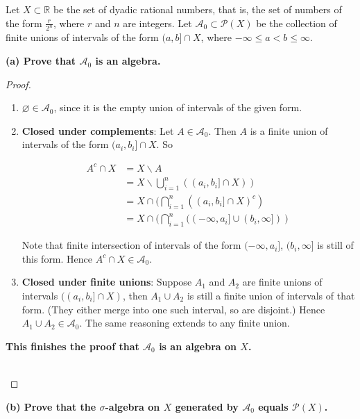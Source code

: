 Let \(X \subset \mathbb{R}\) be the set of dyadic rational numbers, that is, the set of numbers of the form \(\frac{r}{2^{n}}\), where \(r\) and \(n\) are integers. Let \(\mathcal{A}_{0} \subset \mathcal{P}(X)\) be the collection of finite unions of intervals of the form \((a,b\rbrack \cap X\), where \(- \infty \leq a < b \leq \infty\).

\textbf{(a) Prove that \(\mathcal{A}_{0}\) is an algebra.}

\begin{proof}

\begin{enumerate}
\item
  \(\varnothing \in \mathcal{A}_{0}\), since it is the empty union of intervals of the given form.
\item
  \textbf{Closed under complements}: Let \(A \in \mathcal{A}_{0}\). Then \(A\) is a finite union of intervals of the form \((a_{i},b_{i}\rbrack \cap X\). So

  \[\begin{matrix}
  {A^{c} \cap X} & {= X\backslash A} \\
   & {= X\backslash\bigcup\limits_{i = 1}^{n}((a_{i},b_{i}\rbrack \cap X))} \\
   & {= X \cap (\bigcap\limits_{i = 1}^{n}((a_{i},b_{i}\rbrack \cap X)^{c})} \\
   & {= X \cap (\bigcap\limits_{i = 1}^{n}(( - \infty,a_{i}\rbrack \cup (b_{i},\infty\rbrack))}
  \end{matrix}\]

  Note that finite intersection of intervals of the form \(( - \infty,a_{i}\rbrack\), \((b_{i},\infty\rbrack\) is still of this form. Hence \(A^{c} \cap X \in \mathcal{A}_{0}\).
\item
  \textbf{Closed under finite unions}: Suppose \(A_{1}\) and \(A_{2}\) are finite unions of intervals \(((a_{i},b_{i}\rbrack \cap X)\), then \(A_{1} \cup A_{2}\) is still a finite union of intervals of that form. (They either merge into one such interval, so are disjoint.) Hence \(A_{1} \cup A_{2} \in \mathcal{A}_{0}\). The same reasoning extends to any finite union.
\end{enumerate}

\textbf{This finishes the proof that \(\mathcal{A}_{0}\) is an algebra on \(X\).}\\
\strut \\

\end{proof}

\textbf{(b) Prove that the \(\sigma\)-algebra on \(X\) generated by \(\mathcal{A}_{0}\) equals \(\mathcal{P}(X)\).}


